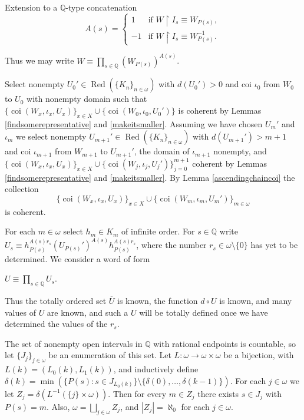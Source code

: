 \documentclass{amsart}
\theoremstyle{definition}\newtheorem{theorem}{Theorem}
\theoremstyle{definition}\newtheorem*{A}{Main Theorem}
\theoremstyle{definition}\newtheorem*{B}{Theorem \ref{elementaryequiv}}
\theoremstyle{definition}\newtheorem*{C}{Theorem \ref{continuous}}
\theoremstyle{definition}\newtheorem*{D}{Theorem \ref{bigisomorphism2}}
\theoremstyle{definition}\newtheorem{bigtheorem}{Main Theorem}
\numberwithin{theorem}{section}
\theoremstyle{definition}\newtheorem{corollary}[theorem]{Corollary}
\theoremstyle{definition}\newtheorem{proposition}[theorem]{Proposition}
\theoremstyle{definition}\newtheorem{definition}[theorem]{Definition}
\theoremstyle{definition}\newtheorem{question}[theorem]{Question}
\theoremstyle{definition}\newtheorem{example}[theorem]{Example}
\theoremstyle{definition}\newtheorem{remark}[theorem]{Remark}
\theoremstyle{definition}\newtheorem{note}[theorem]{Note}
\theoremstyle{definition}\newtheorem{lemma}[theorem]{Lemma}
\theoremstyle{definition}\newtheorem{fact}[theorem]{Fact}
\theoremstyle{definition}\newtheorem{define}[theorem]{Definition}
\theoremstyle{definition}\newtheorem{claim}[theorem]{Claim}
\theoremstyle{definition}\newtheorem{obs}[theorem]{Observation}
\theoremstyle{definition}\newtheorem{definitions}[theorem]{Definitions}
\newcommand{\Red}{\operatorname{Red}}
\newcommand{\coi}{\operatorname{coi}}
\begin{document}
\begin{section}{Extension to a $\mathbb{Q}$-type concatenation}
\[
A(s) = \left\{
\begin{array}{ll}
1
                                            & \text{if }  W \upharpoonright I_s \equiv W_{P(s)}, \\
-1                                        & \text{if }W \upharpoonright I_s \equiv W_{P(s)}^{-1}.
\end{array}
\right.
\]

\noindent Thus we may write $W \equiv \prod_{s \in \mathbb{Q}} (W_{P(s)})^{A(s)}$.

Select nonempty $U_0' \in \Red(\{K_n\}_{n \in \omega})$ with $d(U_0') > 0$ and coi $\iota_0$ from $W_0$ to $U_0$ with nonempty domain such that $\{\coi(W_x, \iota_x, U_x)\}_{x\in X} \cup \{\coi(W_0, \iota_0, U_0')\}$ is coherent by Lemmas \ref{findsomerepresentative} and \ref{makeitsmaller}.  Assuming we have chosen $U_m'$ and $\iota_m$ we select nonempty $U_{m + 1}' \in \Red(\{K_n\}_{n \in \omega})$ with $d(U_{m+1}') > m+1$ and coi $\iota_{m + 1}$ from $W_{m+1}$ to $U_{m+1}'$, the domain of $\iota_{m + 1}$ nonempty, and $\{\coi(W_x, \iota_x, U_x)\}_{x\in X} \cup \{\coi(W_j, \iota_j, U_j')\}_{j = 0}^{m+1}$ coherent by Lemmas \ref{findsomerepresentative} and \ref{makeitsmaller}.  By Lemma \ref{ascendingchaincoi} the collection $$\{\coi(W_x, \iota_x, U_x)\}_{x\in X} \cup \{\coi(W_m, \iota_m, U_m')\}_{m \in \omega}$$ is coherent.

For each $m \in \omega$ select $h_m \in K_m$ of infinite order.  For $s\in \mathbb{Q}$ write $U_s \equiv h_{P(s)}^{A(s)r_s}(U_{P(s)}')^{A(s)}h_{P(s)}^{A(s)r_s}$, where the number $r_s \in \omega \setminus \{0\}$ has yet to be determined.  We consider a word of form


\begin{center}

$U \equiv \prod_{s \in \mathbb{Q}} U_s$.

\end{center}


\noindent Thus the totally ordered set $\overline{U}$ is known, the function $d \circ U$ is known, and many values of $U$ are known, and such a $U$ will be totally defined once we have determined the values of the $r_s$.

The set of nonempty open intervals in $\mathbb{Q}$ with rational endpoints is countable, so let $\{J_j\}_{j \in \omega}$ be an enumeration of this set.  Let $L: \omega \rightarrow \omega \times \omega$ be a bijection, with $L(k) = (L_0(k), L_1(k))$, and inductively define $\delta(k) = \min (\{P(s):s \in J_{L_0(k)}\} \setminus \{\delta(0), \ldots, \delta(k-1)\})$.  For each $j \in \omega$ we let $Z_j = \delta(L^{-1}(\{j\} \times \omega))$.  Then for every $m \in Z_j$ there exists $s \in J_j$ with $P(s) = m$.  Also, $\omega = \bigsqcup_{j \in \omega} Z_j$, and $|Z_j| = \aleph_0$ for each $j \in \omega$.  


\end{section}
\end{document}
